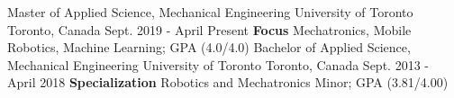 \begin{cventries}
  \cventry
    {Master of Applied Science, Mechanical Engineering}
    {University of Toronto}
    {Toronto, Canada}
    {Sept. 2019 - April Present}
    {\textbf{Focus} Mechatronics, Mobile Robotics, Machine Learning; GPA (4.0/4.0)}
  \cventry
    {Bachelor of Applied Science, Mechanical Engineering}
    {University of Toronto}
    {Toronto, Canada}
    {Sept. 2013 - April 2018}
    {\textbf{Specialization} Robotics and Mechatronics Minor; GPA (3.81/4.00)}
\end{cventries}

